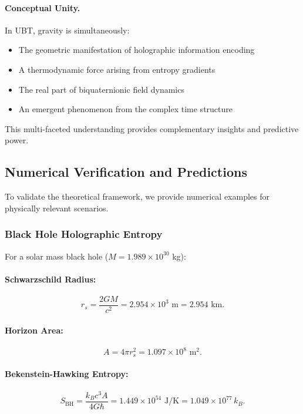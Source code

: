 \paragraph{Conceptual Unity.}
In UBT, gravity is simultaneously:
\begin{itemize}
\item The geometric manifestation of holographic information encoding
\item A thermodynamic force arising from entropy gradients
\item The real part of biquaternionic field dynamics
\item An emergent phenomenon from the complex time structure
\end{itemize}

This multi-faceted understanding provides complementary insights and predictive power.

\subsection{Numerical Verification and Predictions}

To validate the theoretical framework, we provide numerical examples for physically relevant scenarios.

\subsubsection{Black Hole Holographic Entropy}

For a solar mass black hole ($M = 1.989 \times 10^{30}$ kg):

\paragraph{Schwarzschild Radius:}
\begin{equation}
r_s = \frac{2GM}{c^2} = 2.954 \times 10^3 \text{ m} = 2.954 \text{ km}.
\end{equation}

\paragraph{Horizon Area:}
\begin{equation}
A = 4\pi r_s^2 = 1.097 \times 10^8 \text{ m}^2.
\end{equation}

\paragraph{Bekenstein-Hawking Entropy:}
\begin{equation}
S_{\text{BH}} = \frac{k_B c^3 A}{4G\hbar} = 1.449 \times 10^{54} \text{ J/K} = 1.049 \times 10^{77} \, k_B.
\end{equation}

